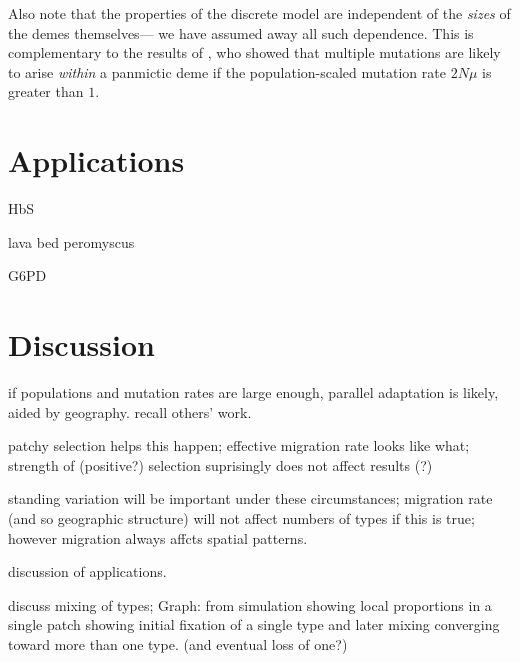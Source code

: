 \documentclass{article}
\begin{document}

Also note that the properties of the discrete model are independent of the {\em sizes} of the demes themselves--- we have assumed away all such dependence.
This is complementary to the results of \cite{softsweepsII}, who showed that multiple mutations are likely to arise {\em within} a panmictic deme
if the population-scaled mutation rate $2 N \mu$ is greater than $1$.

\section{Applications} 

HbS

lava bed peromyscus

G6PD

\section{Discussion} 

if populations and mutation rates are large enough, parallel adaptation is likely, aided by geography. 
recall others' work. 

patchy selection helps this happen; 
effective migration rate looks like what; 
strength of (positive?) selection suprisingly does not affect results (?) 

standing variation will be important under these circumstances; 
migration rate (and so geographic structure) will not affect numbers of types if this is true; 
however migration always affcts spatial patterns. 

discussion of applications. 

discuss mixing of types; 
Graph: from simulation showing local proportions in a single patch showing initial fixation of a single type and later mixing converging toward more than one type.  (and eventual loss of one?)


\end{document}
